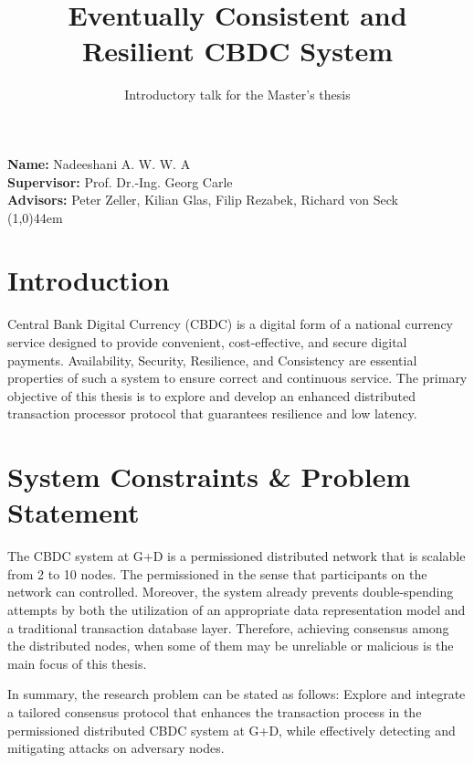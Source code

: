 \documentclass[
  english,        %
  font=times,     %
  onecolumn,      %
]{tumarticle}
\title{Eventually Consistent and Resilient CBDC System
}
\subtitle{Introductory talk for the Master’s thesis}
\author[]{}
\affil[]{}
\date{}
\begin{document}
\maketitle


\vspace{0.5em} \noindent \textcolor{TUMBlue}{ \textbf{Name:}\hspace{3em}} Nadeeshani A. W. W. A \\
\textcolor{TUMBlue}{ \textbf{Supervisor:}\hspace{0.8em}} Prof. Dr.-Ing. Georg Carle \\
\textcolor{TUMBlue}{ \textbf{Advisors:}\hspace{1.6em}} Peter Zeller, Kilian Glas, Filip Rezabek, Richard von Seck \\
{ \noindent \line(1,0){44em}}
\vspace{0.5em}

\section{Introduction}
\hspace{2em}Central Bank Digital Currency (CBDC) is a digital form of a national currency service designed to provide convenient, cost-effective, and secure digital payments.  Availability, Security, Resilience, and Consistency \cite{zhang2022blockchain} are essential properties of such a system to ensure correct and continuous service. The primary objective of this thesis is to explore and develop an enhanced distributed transaction processor protocol that guarantees resilience and low latency.

\section{System Constraints  \& Problem Statement}
\hspace{2em}The CBDC system at G+D is a permissioned distributed network that is scalable from 2 to 10 nodes. The permissioned in the sense that participants on the network can controlled. Moreover, the system already prevents double-spending attempts by both the utilization of an appropriate data representation model and a traditional transaction database layer. Therefore, achieving consensus among the distributed nodes, when some of them may be unreliable or malicious is the main focus of this thesis.

\hspace{1em}In summary, the research problem can be stated as follows: Explore and integrate a tailored consensus protocol that enhances the transaction process in the permissioned distributed CBDC system at G+D, while effectively detecting and mitigating attacks on adversary nodes.
\end{document}
